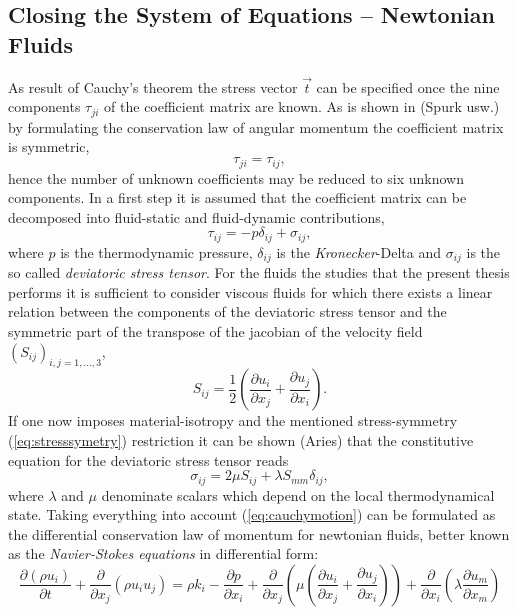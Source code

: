     \subsection{Closing the System of Equations -- Newtonian Fluids}
    \label{sec:fundclosing}

    As result of Cauchy's theorem the stress vector \( \vec{t} \) can be specified once the nine components \(\tau_{ji}\) of the coefficient matrix are known. As is shown in (Spurk usw.) by formulating the conservation law of angular momentum the coefficient matrix is symmetric, 
    \begin{equation}
      \label{eq:stresssymetry}
      \tau_{ji} = \tau_{ij},
    \end{equation}
    hence the number of unknown coefficients may be reduced to six unknown components. In a first step it is assumed that the coefficient matrix can be decomposed into fluid-static and fluid-dynamic contributions,
    \begin{displaymath}
      \tau_{ij} = -p \delta_{ij} + \sigma_{ij},
    \end{displaymath}
    where \(p\) is the thermodynamic pressure, \(\delta_{ij}\) is the \textit{Kronecker}-Delta and \( \sigma_{ij} \) is the so called \textit{deviatoric stress tensor}. For the fluids the studies that the present thesis performs it is sufficient to consider viscous fluids for which there exists a linear relation between the components of the deviatoric stress tensor and the symmetric part of the transpose of the jacobian of the velocity field \(\left( S_{ij} \right)_{i,j=1,\dots,3}\),
    \begin{displaymath}
      S_{ij} = \frac{1}{2} \left( \frac{\partial u_i}{\partial x_j} + \frac{\partial u_j}{\partial x_i} \right).
    \end{displaymath}
    If one now imposes material-isotropy and the mentioned stress-symmetry (\ref{eq:stresssymetry}) restriction it can be shown (Aries) that the constitutive equation for the deviatoric stress tensor reads 
    \begin{displaymath}
      \sigma_{ij} = 2 \mu S_{ij} + \lambda S_{mm} \delta_{ij},
    \end{displaymath}
    where \(\lambda\) and \(\mu\) denominate scalars which depend on the local thermodynamical state. Taking everything into account (\ref{eq:cauchymotion}) can be formulated as the differential conservation law of momentum for newtonian fluids, better known as the \textit{Navier-Stokes equations} in differential form:
    \begin{equation}
      \label{eq:nsfull}
      \frac{\partial \left(\rho u_i \right)}{\partial t} 
      + \frac{\partial}{\partial x_j} \left( \rho u_i  u_j \right) 
      = \rho k_i
      - \frac{\partial p}{\partial x_i}
      + \frac{\partial}{\partial x_j} \left( \mu  \left( \frac{\partial u_i}{\partial x_j} 
                                              + \frac{\partial u_j}{\partial x_i} \right) \right)
      + \frac{\partial}{\partial x_i} \left(\lambda \frac{\partial u_m}{\partial x_m} \right)
    \end{equation}

